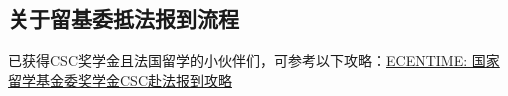 \subsection{关于留基委抵法报到流程}
已获得CSC奖学金且法国留学的小伙伴们，可参考以下攻略：\href{https://www.ecentime.com/article/CSC-China-Scholarship}{ECENTIME: 国家留学基金委奖学金CSC赴法报到攻略} 
